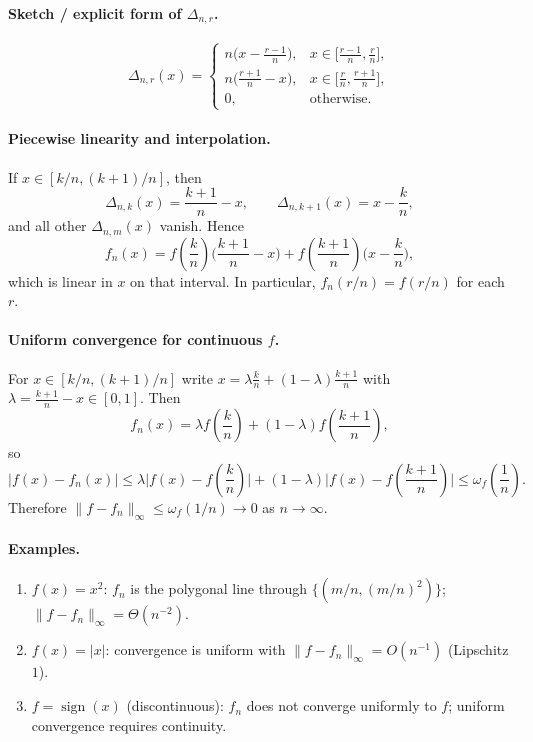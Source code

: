\documentclass[12pt,a4paper]{article}
\theoremstyle{plain}
\theoremstyle{definition}
\theoremstyle{remark}
\theoremstyle{remark}
\begin{document}
\paragraph{Sketch / explicit form of $\Delta_{n,r}$.}
\[
\Delta_{n,r}(x)=
\begin{cases}
	n\big(x-\frac{r-1}{n}\big), & x\in\big[\frac{r-1}{n},\frac{r}{n}\big],\\[2pt]
	n\big(\frac{r+1}{n}-x\big), & x\in\big[\frac{r}{n},\frac{r+1}{n}\big],\\[2pt]
	0, & \text{otherwise.}
\end{cases}
\]

\paragraph{Piecewise linearity and interpolation.}
If $x\in[k/n,(k+1)/n]$, then
\[
\Delta_{n,k}(x)=\frac{k+1}{n}-x,\qquad
\Delta_{n,k+1}(x)=x-\frac{k}{n},
\]
and all other $\Delta_{n,m}(x)$ vanish. Hence
\[
f_n(x)=f\!\left(\frac{k}{n}\right)\Big(\frac{k+1}{n}-x\Big)
+f\!\left(\frac{k+1}{n}\right)\Big(x-\frac{k}{n}\Big),
\]
which is linear in $x$ on that interval. In particular,
$f_n(r/n)=f(r/n)$ for each $r$.

\paragraph{Uniform convergence for continuous $f$.}
For $x\in[k/n,(k+1)/n]$ write $x=\lambda \frac{k}{n}+(1-\lambda)\frac{k+1}{n}$ with
$\lambda=\frac{k+1}{n}-x\in[0,1]$. Then
\[
f_n(x)=\lambda f\!\left(\frac{k}{n}\right)
+(1-\lambda)f\!\left(\frac{k+1}{n}\right),
\]
so
\[
|f(x)-f_n(x)|
\le \lambda\Big|f(x)-f\!\left(\frac{k}{n}\right)\Big|
+(1-\lambda)\Big|f(x)-f\!\left(\frac{k+1}{n}\right)\Big|
\le \omega_f\!\left(\frac{1}{n}\right).
\]
Therefore $\|f-f_n\|_\infty \le \omega_f(1/n)\to0$ as $n\to\infty$.

\paragraph{Examples.}
\begin{enumerate}[label=(\arabic*), leftmargin=*]
	\item $f(x)=x^2$: $f_n$ is the polygonal line through $\{(m/n,(m/n)^2)\}$;
	$\|f-f_n\|_\infty=\Theta(n^{-2})$.
	\item $f(x)=|x|$: convergence is uniform with $\|f-f_n\|_\infty=O(n^{-1})$ (Lipschitz $1$).
	\item $f=\operatorname{sign}(x)$ (discontinuous): $f_n$ does not converge uniformly to $f$;
	uniform convergence requires continuity.
\end{enumerate}
\end{document}
